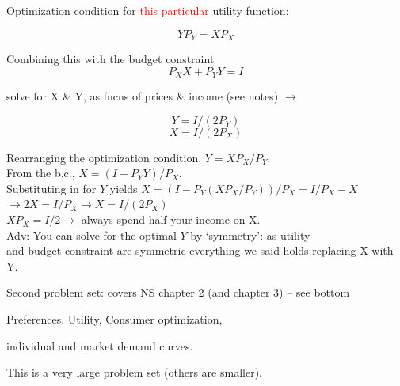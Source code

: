 \documentclass[table]{beamer}
\begin{document}
\begin{frame}

Optimization condition for \textcolor{red}{this particular} utility
function:

\[Y P_Y = X P_X\]

Combining this with the budget constraint \[P_X X + P_Y Y = I\]

solve for X \& Y, as fncns of prices \& income (see notes)
\(\rightarrow\)

\medskip

\[Y = I/(2P_Y)\] \[X = I/(2P_X)\]

Rearranging the optimization condition, \(Y = X P_X/P_Y\).\\
From the b.c., \(X = (I - P_Y Y)/P_X\).\\
Substituting in for \(Y\) yields
\(X = (I - P_Y(X P_X / P_Y))/P_X = I/P_X - X\)\\
\(\rightarrow 2X = I/P_X \rightarrow X = I/(2P_X)\)\\
\(X P_X = I / 2 \rightarrow\) always spend half your income on X.\\
Adv: You can solve for the optimal \(Y\) by `symmetry': as utility\\
and budget constraint are symmetric everything we said holds replacing X
with Y.\\

\end{frame}

\begin{frame}{Second problem set: covers NS chapter 2 (and chapter 3) --
see bottom}
\protect\hypertarget{second-problem-set-covers-ns-chapter-2-and-chapter-3-see-bottom}{}

Preferences, Utility, Consumer optimization,

\bigskip

individual and market demand curves.

This is a very large problem set (others are smaller).

\end{frame}

\begin{frame}

\end{frame}
\end{document}
